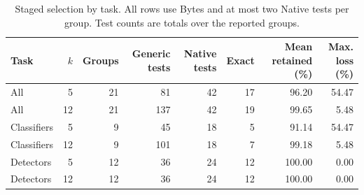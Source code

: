\begin{table}[t]
\centering\small
\caption{Staged selection by task. All rows use Bytes and at most two Native tests per group. Test counts are totals over the reported groups.}
\label{tab:staged-task-budgets}
\begin{tabular}{@{}lrrrrrrr@{}}
\toprule
Task & $k$ & Groups & Generic tests & Native tests & Exact & Mean retained (\%) & Max. loss (\%) \\
\midrule
All & 5 & 21 & 81 & 42 & 17 & 96.20 & 54.47 \\
All & 12 & 21 & 137 & 42 & 19 & 99.65 & 5.48 \\
Classifiers & 5 & 9 & 45 & 18 & 5 & 91.14 & 54.47 \\
Classifiers & 12 & 9 & 101 & 18 & 7 & 99.18 & 5.48 \\
Detectors & 5 & 12 & 36 & 24 & 12 & 100.00 & 0.00 \\
Detectors & 12 & 12 & 36 & 24 & 12 & 100.00 & 0.00 \\
\bottomrule
\end{tabular}
\end{table}
